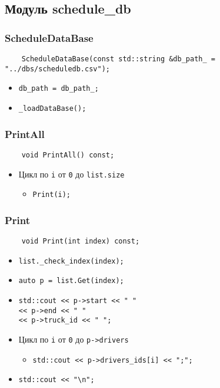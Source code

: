 \subsection{Модуль schedule\_db}

\subsubsection{ScheduleDataBase}

\begin{lstlisting}
    ScheduleDataBase(const std::string &db_path_ = "../dbs/scheduledb.csv");
\end{lstlisting}

\begin{itemize}
    \item \verb|db_path = db_path_;|
    \item \verb|_loadDataBase();|
\end{itemize}

\subsubsection{PrintAll}

\begin{lstlisting}
    void PrintAll() const;
\end{lstlisting}

\begin{itemize}
    \item Цикл по \verb|i| от \verb|0| до \verb|list.size| 
        \begin{itemize}
            \item \verb|Print(i);|
        \end{itemize}
\end{itemize}

\subsubsection{Print}

\begin{lstlisting}
    void Print(int index) const;
\end{lstlisting}

\begin{itemize}
    \item \verb|list._check_index(index);|
    \item \verb|auto p = list.Get(index);|
    \item \verb|std::cout << p->start << " "|\\
          \verb|<< p->end << " "|\\
          \verb|<< p->truck_id << " ";|
    \item Цикл по \verb|i| от \verb|0| до \verb|p->drivers| 
        \begin{itemize}
            \item \verb|std::cout << p->drivers_ids[i] << ";";|
        \end{itemize}
    \item \verb|std::cout << "\n";|
\end{itemize}

